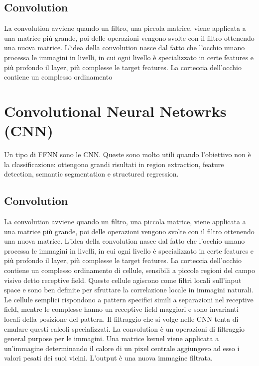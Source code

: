 	\subsection{Convolution}
	La convolution avviene quando un filtro, una piccola matrice, viene applicata a una matrice pi\`u grande, poi delle operazioni vengono svolte con il filtro ottenendo una nuova matrice.
	L'idea della convolution nasce dal fatto che l'occhio umano processa le immagini in livelli, in cui ogni livello \`e specializzato in certe features e pi\`u profondo il layer, pi\`u complesse le target features.
	La corteccia dell'occhio contiene un complesso ordinamento\section{Convolutional Neural Netowrks (CNN)}
	Un tipo di FFNN sono le CNN.
	Queste sono molto utili quando l'obiettivo non \`e la classificazione: ottengono grandi risultati in region extraction, feature detection, semantic segmentation e structured regression.

		\subsection{Convolution}
		La convolution avviene quando un filtro, una piccola matrice, viene applicata a una matrice pi\`u grande, poi delle operazioni vengono svolte con il filtro ottenendo una nuova matrice.
		L'idea della convolution nasce dal fatto che l'occhio umano processa le immagini in livelli, in cui ogni livello \`e specializzato in certe features e pi\`u profondo il layer, pi\`u complesse le target features.
		La corteccia dell'occhio contiene un complesso ordinamento di cellule, sensibili a piccole regioni del campo visivo detto receptive field.
		Queste cellule agiscono come filtri locali sull'input space e sono ben definite per sfruttare la correlazione locale in immagini naturali.
		Le cellule semplici rispondono a pattern specifici simili a separazioni nel receptive field, mentre le complesse hanno un receptive field maggiori e sono invarianti locali della posizione del pattern.
		Il filtraggio che si volge nelle CNN tenta di emulare questi calcoli specializzati.
		La convolution \`e un operazioni di filtraggio general purpose per le immagini.
		Una matrice kernel viene applicata a un'immagine determinando il calore di un pixel centrale aggiungevo ad esso i valori pesati dei suoi vicini.
		L'output \`e una nuova immagine filtrata.


